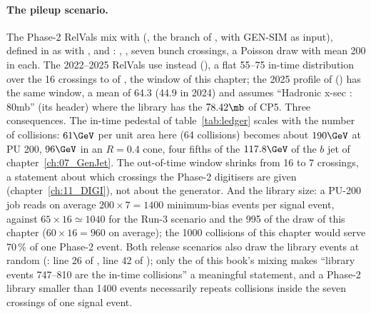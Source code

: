 \paragraph{The pileup scenario.} The Phase-2 RelVals mix with 
(, the  branch of
, with  GEN-SIM as input), defined in
 as  with
,  and : , , seven bunch
crossings, a Poisson draw with mean 200 in each. The 2022--2025 RelVals use instead
 (),
a flat 55--75 in-time distribution over the 16 crossings  to  of
, the window of this chapter; the 2025 profile of 
() has the same window, a mean
of 64.3 (44.9 in 2024) and assumes ``Hadronic x-sec : 80mb'' (its header) where the library has the $78.42\mb$ of
CP5. Three consequences. The in-time pedestal of
table~\ref{tab:ledger} scales with the number of collisions: $61\GeV$ per unit area here (64 collisions)
becomes about $190\GeV$ at PU 200, $96\GeV$ in an $R=0.4$ cone, four fifths of the $117.8\GeV$ of the $b$ jet
of chapter~\ref{ch:07_GenJet}. The out-of-time window shrinks from 16 to 7 crossings, a statement about which
crossings the Phase-2 digitisers are given (chapter~\ref{ch:11_DIGI}), not about the generator. And the
library size: a PU-200 job reads on average $200\times7 = 1400$ minimum-bias events per signal event, against
$65\times16 \simeq 1040$ for the Run-3 scenario and the 995 of the draw of this chapter ($60\times16 = 960$ on
average); the 1000 collisions of this chapter would serve 70\,\% of one Phase-2 event. Both release scenarios
also draw the library events at random (: line 26 of ,
line 42 of ); only the  of this book's
mixing makes ``library events 747--810 are the in-time collisions'' a meaningful statement, and a Phase-2 library
smaller than 1400 events necessarily repeats collisions inside the seven crossings of one signal event.

